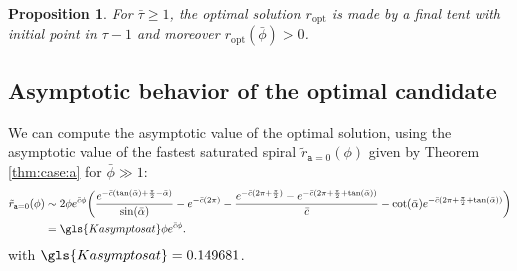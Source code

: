 \documentclass[reqno]{amsart}
\theoremstyle{definition} \newtheorem{definition}{Definition}[section]
\theoremstyle{definition} \newtheorem{remark}[definition]{Remark}
\theoremstyle{plain} \newtheorem{lemma}[definition]{Lemma}
\theoremstyle{plain} \newtheorem{proposition}[definition]{Proposition}
\theoremstyle{plain} \newtheorem{theorem}[definition]{Theorem}
\theoremstyle{plain} \newtheorem{corollary}[definition]{Corollary}
\theoremstyle{definition} \newtheorem{example}[definition]{Example}
\theoremstyle{plain} \newtheorem{claim}[clai]{Claim}
\theoremstyle{definition} \newtheorem{assumption}[definition]{Assumption}
\theoremstyle{definition} \newtheorem{observation}[definition]{Observation}
\newcommand{\1}{\mathbbm 1}
\numberwithin{equation}{section} %
\theoremstyle{plain} \newtheorem*{theorem*}{Theorem}
\theoremstyle{plain} \newtheorem{mthm}[maintheorem]{Main Theorem}
\theoremstyle{plain} \newtheorem*{mthm*}{Main Theorem}
\theoremstyle{plain} \newtheorem*{conjecture*}{Conjecture}
\theoremstyle{plain} \newtheorem{conjecture}[definition]{Conjecture}
\theoremstyle{plain} \newtheorem*{problem*}{Problem}
\begin{document}

\begin{proposition}
\label{Prop:e_opt_large_phi}
For $\bar \tau \geq 1$, the optimal solution $r_\mathrm{opt}$ is made by a final tent with initial point in $\tau - 1$ and moreover $r_\mathrm{opt}(\bar \phi) > 0$.
\end{proposition}

\subsection{Asymptotic behavior of the optimal candidate}
\label{Ss:optimal_asympt}


We can compute the asymptotic value of the optimal solution, using the asymptotic value of the fastest saturated spiral $\tilde r_{\mathtt a = 0}(\phi)$ given by Theorem \ref{thm:case:a} for $\bar \phi \gg 1$: 
\begin{align*}
\tilde r_{\mathtt a = 0}(\phi) &\sim 2 \phi e^{\bar c \phi} \bigg( \frac{e^{-\bar c(\tan(\bar \alpha) + \frac{\pi}{2} - \bar \alpha)}}{\sin(\bar \alpha)} - e^{-\bar c(2\pi)} - \frac{e^{-\bar c(2\pi + \frac{\pi}{2})} - e^{- \bar c (2\pi + \frac{\pi}{2} + \tan(\bar \alpha))}}{\bar c} - \cot(\bar \alpha) e^{-\bar c(2\pi + \frac{\pi}{2} + \tan(\bar \alpha))} \bigg) \\
&= \gls{Kasymptosat} \phi e^{\bar c \phi}.
\end{align*}
with $\gls{Kasymptosat} = 0.149681$.
\end{document}
